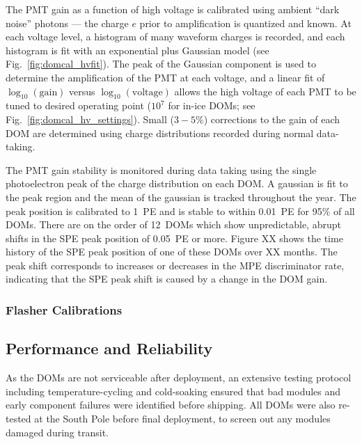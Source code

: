 The PMT gain as a function of high voltage is calibrated using ambient
``dark noise'' photons --- the charge $e$ prior to amplification is quantized
and known.  At each voltage level, a histogram of many waveform charges is recorded,
and each histogram is fit with an exponential plus Gaussian model (see
Fig.~\ref{fig:domcal_hvfit}).  The peak of the Gaussian component is used to
determine the amplification of the PMT at each voltage, and a linear fit
of $\log_{10}(\mathrm{gain})$ versus $\log_{10}(\mathrm{voltage})$ allows
the high voltage of each PMT to be tuned to desired operating point ($10^7$
for in-ice DOMs; see Fig.~\ref{fig:domcal_hv_settings}).  Small ($3-5\%$)
corrections to the gain of each DOM are determined using charge
distributions recorded during normal data-taking.

The PMT gain stability is monitored during data taking using the
single photoelectron peak of the charge distribution on each DOM. A
gaussian is fit to the peak region and the mean of the gaussian is
tracked throughout the year. The peak position is calibrated to 1~PE
and is stable to within 0.01~PE for 95\% of all DOMs. There are on the
order of 12~DOMs which show unpredictable, abrupt shifts in the SPE peak
position of 0.05~PE or more. Figure XX shows the time history of the
SPE peak position of one of these DOMs over XX months. The peak shift
corresponds to increases or decreases in the MPE discriminator rate,
indicating that the SPE peak shift is caused by a change in the DOM
gain. 

\subsubsection{Flasher Calibrations}

\subsection{Performance and Reliability}

As the DOMs are not serviceable after deployment, an extensive testing
protocol including temperature-cycling and cold-soaking ensured that bad
modules and early component failures were identified before shipping.
All DOMs were also re-tested at the South Pole before final deployment, to
screen out any modules damaged during transit.

